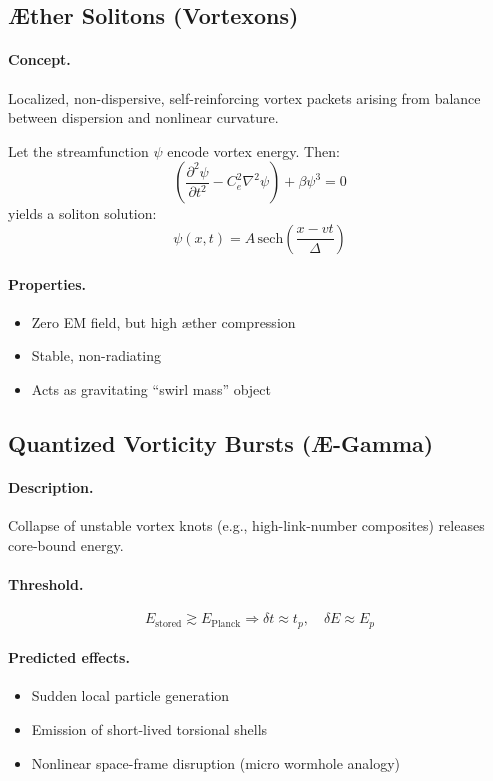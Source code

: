 \documentclass[12pt]{article}
\begin{document}
\subsection{Æther Solitons (Vortexons)}

\paragraph{Concept.} Localized, non-dispersive, self-reinforcing vortex packets arising from balance between dispersion and nonlinear curvature.

Let the streamfunction \( \psi \) encode vortex energy. Then:
\[
\left( \frac{\partial^2 \psi}{\partial t^2}
- C_e^2 \nabla^2 \psi \right) + \beta \psi^3 = 0
\]
yields a soliton solution:
\[
\psi(x,t) = A\,\text{sech}\left( \frac{x - v t}{\Delta} \right)
\]

\paragraph{Properties.}
\begin{itemize}
  \item Zero EM field, but high \ae{}ther compression
  \item Stable, non-radiating
  \item Acts as gravitating “swirl mass” object
\end{itemize}

\subsection{Quantized Vorticity Bursts (Æ-Gamma)}

\paragraph{Description.} Collapse of unstable vortex knots (e.g., high-link-number composites) releases core-bound energy.

\paragraph{Threshold.}
\[
E_\text{stored} \gtrsim E_\text{Planck} \Rightarrow \delta t \approx t_p,\quad \delta E \approx E_p
\]

\paragraph{Predicted effects.}
\begin{itemize}
  \item Sudden local particle generation
  \item Emission of short-lived torsional shells
  \item Nonlinear space-frame disruption (micro wormhole analogy)
\end{itemize}
\end{document}
